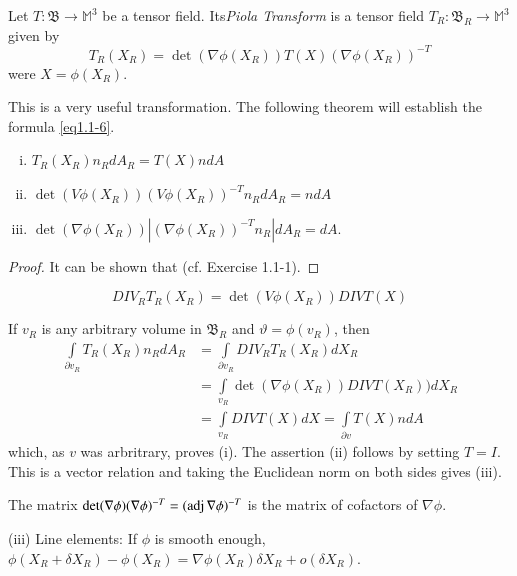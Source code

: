 Let $T : \mathfrak{B} \to \mathbb{M}^3$ be a tensor
field. Its\textit{Piola Transform} is a tensor field $T _R:
\mathfrak{B}_R \to \mathbb{M}^3$ given by  
\begin{equation*}
  T_R(X_R) = \det (\nabla  \phi (X_R)) T(X) (\nabla
  \phi (X_R))^{-T} \tag{1.1-9} \label{eq1.1-9}
\end{equation*}
were $X = \phi (X_R)$.

This is a very useful transformation. The following theorem will
establish the formula \eqref{eq1.1-6}. 
\begin{theorem}\label{chap1-thm1.1.1} %
\begin{enumerate}[(i)]
\item $T_R (X_R) n_R dA_R = T(X) n dA$\pageoriginale 
\item $\det (V \phi (X_R)) (V \phi (X_R))^{-T} n_R dA_R = ndA$
\item $\det (\nabla \phi (X_R)) | (\nabla  \phi
 (X_R))^{-T} n_R | dA_R = dA$. 
\end{enumerate}
\end{theorem}

\begin{proof}
It can be shown that (cf. Exercise 1.1-1).
\end{proof}
\begin{equation*}
DIV_R T_R (X_R) = \det (V \phi (X_R)) DIV T(X) \tag{1.1-10}\label{eq1.1-10}
\end{equation*}

If $v_R$ is any arbitrary volume in $\mathfrak{B}_R$ and
$\vartheta = \phi (v_R)$, then 
\begin{align*}
\int \limits_{\partial v_R} T_R (X_R) n_R dA_R & = \int
\limits_{\partial v_R} DIV_R T_R (X_R) dX_R \\ 
& = \int \limits_{v_R} \det (\nabla
\phi(X_R)) DIV T(X_R)) dX_R \\ 
& = \int \limits_{v_R} DIV T(X) dX = \int
\limits_{\partial v} T(X) n dA 
\end{align*}
which, as $v$ was arbritrary, proves (i). The assertion
(ii) follows by setting $T = I$. This is a vector relation and
taking the Euclidean norm on both sides gives (iii). 

\begin{remark}\label{chap1-rem1.1-2} %
  The matrix $\det (\nabla \phi) (\nabla  \phi)^{-T} =
  (\operatorname{adj}  \nabla \phi)^{-T}$ is the matrix of cofactors of
  $\nabla  \phi$. 
\end{remark}
(iii) Line elements: If $\phi$ is smooth enough, 
$\phi (X_R + \delta X_R ) - \phi(X_R) = \nabla  \phi (X_R)
\delta X_R + o (\delta X_R)$. 

